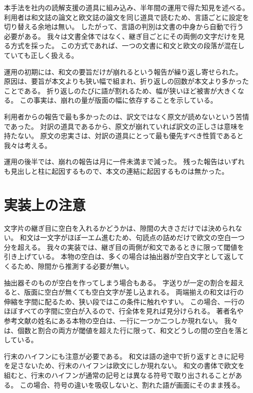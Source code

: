 \documentclass[10pt,a4paper,twocolumn]{article}
\newcommand{\s}[1]{#1}
\begin{document}
\s{本手法を社内の読解支援の道具に組み込み、半年間の運用で得た知見を述べる。}%
\s{利用者は和文誌の論文と欧文誌の論文を同じ道具で読むため、言語ごとに設定を切り替える余地は無い。}%
\s{したがって、言語の判別は文書の中身から自動で行う必要がある。}%
\s{我々は文書全体ではなく、継ぎ目ごとにその両側の文字だけを見る方式を採った。}%
\s{この方式であれば、一つの文書に和文と欧文の段落が混在していても正しく扱える。}%

\s{運用の初期には、和文の要旨だけが崩れるという報告が繰り返し寄せられた。}%
\s{原因は、要旨が本文よりも狭い幅で組まれ、折り返しの回数が本文より多かったことである。}%
\s{折り返しのたびに語が割れるため、幅が狭いほど被害が大きくなる。}%
\s{この事実は、崩れの量が版面の幅に依存することを示している。}%

\s{利用者からの報告で最も多かったのは、訳文ではなく原文が読めないという苦情であった。}%
\s{対訳の道具であるから、原文が崩れていれば訳文の正しさは意味を持たない。}%
\s{原文の忠実さは、対訳の道具にとって最も優先すべき性質であると我々は考える。}%

\s{運用の後半では、崩れの報告は月に一件未満まで減った。}%
\s{残った報告はいずれも見出しと柱に起因するもので、本文の連結に起因するものは無かった。}%

\section{実装上の注意}

\s{文字片の継ぎ目に空白を入れるかどうかは、隙間の大きさだけでは決められない。}%
\s{和文は一文字がほぼ一エム進むため、句読点の詰めだけで欧文の空白一つ分を超える。}%
\s{我々の実装では、継ぎ目の両側が和文であるときに限って閾値を引き上げている。}%
\s{本物の空白は、多くの場合は抽出器が空白文字として返してくるため、隙間から推測する必要が無い。}%

\s{抽出器そのものが空白を作ってしまう場合もある。}%
\s{字送りが一定の割合を超えると、版面に空白が無くても空白文字が差し込まれる。}%
\s{両端揃えの和文は行の伸縮を字間に配るため、狭い段ではこの条件に触れやすい。}%
\s{この場合、一行のほぼすべての字間に空白が入るので、行全体を見れば見分けられる。}%
\s{著者名や参考文献の姓名にある本物の空白は、一行に一つか二つしか現れない。}%
\s{我々は、個数と割合の両方が閾値を超えた行に限って、和文どうしの間の空白を落としている。}%

\s{行末のハイフンにも注意が必要である。}%
\s{和文は語の途中で折り返すときに記号を足さないため、行末のハイフンは欧文にしか現れない。}%
\s{和文の書体で欧文を組むと、行末のハイフンが通常の記号とは異なる符号で取り出されることがある。}%
\s{この場合、符号の違いを吸収しないと、割れた語が画面にそのまま残る。}%
\end{document}
